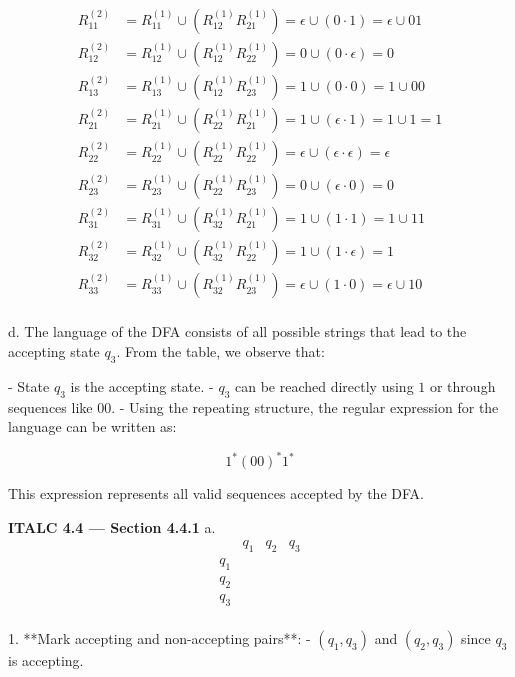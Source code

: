 \documentclass{article}
\theoremstyle{theorem}
\theoremstyle{definition}
\theoremstyle{remark}
\begin{document}
\[
\begin{aligned}
R_{11}^{(2)} &= R_{11}^{(1)} \cup (R_{12}^{(1)} R_{21}^{(1)}) = \epsilon \cup (0 \cdot 1) = \epsilon \cup 01 \\
R_{12}^{(2)} &= R_{12}^{(1)} \cup (R_{12}^{(1)} R_{22}^{(1)}) = 0 \cup (0 \cdot \epsilon) = 0 \\
R_{13}^{(2)} &= R_{13}^{(1)} \cup (R_{12}^{(1)} R_{23}^{(1)}) = 1 \cup (0 \cdot 0) = 1 \cup 00 \\
R_{21}^{(2)} &= R_{21}^{(1)} \cup (R_{22}^{(1)} R_{21}^{(1)}) = 1 \cup (\epsilon \cdot 1) = 1 \cup 1 = 1 \\
R_{22}^{(2)} &= R_{22}^{(1)} \cup (R_{22}^{(1)} R_{22}^{(1)}) = \epsilon \cup (\epsilon \cdot \epsilon) = \epsilon \\
R_{23}^{(2)} &= R_{23}^{(1)} \cup (R_{22}^{(1)} R_{23}^{(1)}) = 0 \cup (\epsilon \cdot 0) = 0 \\
R_{31}^{(2)} &= R_{31}^{(1)} \cup (R_{32}^{(1)} R_{21}^{(1)}) = 1 \cup (1 \cdot 1) = 1 \cup 11 \\
R_{32}^{(2)} &= R_{32}^{(1)} \cup (R_{32}^{(1)} R_{22}^{(1)}) = 1 \cup (1 \cdot \epsilon) = 1 \\
R_{33}^{(2)} &= R_{33}^{(1)} \cup (R_{32}^{(1)} R_{23}^{(1)}) = \epsilon \cup (1 \cdot 0) = \epsilon \cup 10 \\
\end{aligned}
\]

d. The language of the DFA consists of all possible strings that lead to the accepting state \( q_3 \). From the table, we observe that:

- State \( q_3 \) is the accepting state.
- \( q_3 \) can be reached directly using \( 1 \) or through sequences like \( 00 \).
- Using the repeating structure, the regular expression for the language can be written as:

\[
1^* (00)^* 1^*
\]

This expression represents all valid sequences accepted by the DFA.

\noindent\textbf{ITALC 4.4 — Section 4.4.1}
a. 
\[
\begin{array}{c|ccccc}
    & q_1 & q_2 & q_3 \\
\hline
q_1 &     &     &     \\
q_2 &     &     &     \\
q_3 &     &     &     \\
\end{array}
\]

1. **Mark accepting and non-accepting pairs**:  
    - \( (q_1, q_3) \) and \( (q_2, q_3) \) since \( q_3 \) is accepting.
\end{document}

